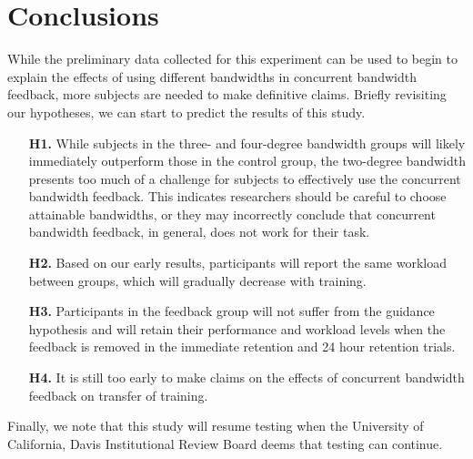 \section{Conclusions}
While the preliminary data collected for this experiment can be used to begin to explain the effects of using different bandwidths in concurrent bandwidth feedback, more subjects are needed to make definitive claims.
Briefly revisiting our hypotheses, we can start to predict the results of this study.
\begin{itemize}
    \item[\textbf{H1.}] While subjects in the three- and four-degree bandwidth groups will likely immediately outperform those in the control group, the two-degree bandwidth presents too much of a challenge for subjects to effectively use the concurrent bandwidth feedback.
          This indicates researchers should be careful to choose attainable bandwidths, or they may incorrectly conclude that concurrent bandwidth feedback, in general, does not work for their task.
    \item[\textbf{H2.}] Based on our early results, participants will report the same workload between groups, which will gradually decrease with training.
    \item[\textbf{H3.}] Participants in the feedback group will not suffer from the guidance hypothesis and will retain their performance and workload levels when the feedback is removed in the immediate retention and 24 hour retention trials.
    \item[\textbf{H4.}] It is still too early to make claims on the effects of concurrent bandwidth feedback on transfer of training.
\end{itemize}
Finally, we note that this study will resume testing when the University of California, Davis Institutional Review Board deems that testing can continue.
